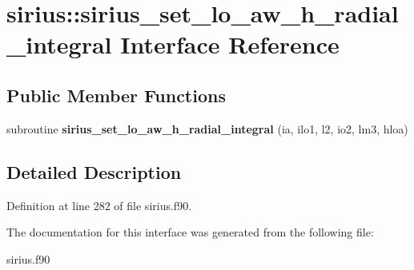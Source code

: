 \hypertarget{interfacesirius_1_1sirius__set__lo__aw__h__radial__integral}{}\section{sirius\+:\+:sirius\+\_\+set\+\_\+lo\+\_\+aw\+\_\+h\+\_\+radial\+\_\+integral Interface Reference}
\label{interfacesirius_1_1sirius__set__lo__aw__h__radial__integral}
\subsection*{Public Member Functions}
\begin{DoxyCompactItemize}
\item 
\hypertarget{interfacesirius_1_1sirius__set__lo__aw__h__radial__integral_aba60ecc22e87ac91309c382b859c42f5}{}subroutine {\bfseries sirius\+\_\+set\+\_\+lo\+\_\+aw\+\_\+h\+\_\+radial\+\_\+integral} (ia, ilo1, l2, io2, lm3, hloa)\label{interfacesirius_1_1sirius__set__lo__aw__h__radial__integral_aba60ecc22e87ac91309c382b859c42f5}

\end{DoxyCompactItemize}


\subsection{Detailed Description}


Definition at line 282 of file sirius.\+f90.



The documentation for this interface was generated from the following file\+:\begin{DoxyCompactItemize}
\item 
sirius.\+f90\end{DoxyCompactItemize}
